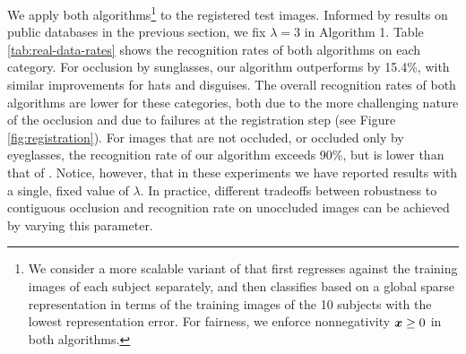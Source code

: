 We apply both algorithms\footnote{We consider a more scalable variant of \cite{Wright2009-PAMI} that first regresses against the training images of each subject separately, and then classifies based on a global sparse representation in terms of the training images of the 10 subjects with the lowest representation error. For fairness, we enforce nonnegativity ${\boldsymbol{x}} \ge 0$ in both algorithms.} to the registered test images. Informed by results on public databases in the previous section, we fix $\lambda = 3$ in Algorithm 1. Table \ref{tab:real-data-rates} shows the recognition rates of both algorithms on each category. For occlusion by sunglasses, our algorithm outperforms \cite{Wright2009-PAMI} by 15.4\%, with similar improvements for hats and disguises. The overall recognition rates of both algorithms are lower for these categories, both due to the more challenging nature of the occlusion and due to failures at the registration step (see Figure \ref{fig:registration}). For images that are not occluded, or occluded only by eyeglasses, the recognition rate of our algorithm exceeds 90\%, but is lower than that of \cite{Wright2009-PAMI}. Notice, however, that in these experiments we have reported results with a single, fixed value of $\lambda$. In practice, different tradeoffs between robustness to contiguous occlusion and recognition rate on unoccluded images can be achieved by varying this parameter.\vspace{0mm}

